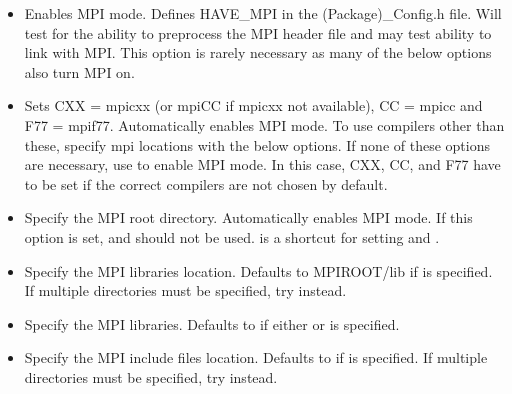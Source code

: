 \documentclass[12pt,relax]{TrilinosDevGuide}
\begin{document}
\begin{itemize}
\item {}

Enables MPI mode. Defines HAVE\_MPI in the (Package)\_Config.h file. Will test 
for the ability to preprocess the MPI header file and may test ability to link 
with MPI.  This option is rarely necessary as many of the below options also 
turn MPI on.  

\item {}

Sets CXX = mpicxx (or mpiCC if mpicxx not available), CC = mpicc and 
F77 = mpif77.  Automatically enables MPI mode.  To use compilers other than 
these, specify mpi locations with the below options.  If none of these options 
are necessary, use  to enable MPI mode.  In this 
case, CXX, CC, and F77 have to be set if the correct compilers are 
not chosen by default.

\item {}

Specify the MPI root directory. Automatically enables MPI mode.  If this 
option is set,  and 
 should not be used.  
 is a shortcut for setting \newline
{} 
and \newline {}.

\item {}

Specify the MPI libraries location. Defaults to MPIROOT/lib if 
 is specified. If multiple directories must be 
specified, try \newline
{} instead. 

\item {} 

Specify the MPI libraries. Defaults to 
 if either or 
 is specified.

\item {}

Specify the MPI include files location. Defaults to  if 
 is specified. If multiple directories  must be specified, try 
\newline
{} instead.
\end{itemize}
\end{document}
